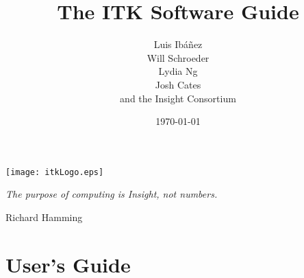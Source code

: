 \documentclass{InsightSoftwareGuide}
\title{The ITK Software Guide}
\author{Luis Ib\'{a}\~{n}ez\\Will Schroeder\\Lydia Ng\\Josh Cates\\and the Insight Consortium}
\date{\today}
\newif\ifitkFullVersion
\newif\ifitkPrintedVersion
\begin{document}

\maketitle

\frontmatter




%
%
\newpage

\begin{minipage}[t][10cm][b]{\textwidth}
\center
\texttt{[image: itkLogo.eps]}
\large
\begin{center}
\emph{The purpose of computing is Insight, not numbers.}\\
\end{center}
\hspace{8cm} Richard Hamming
\normalsize
\end{minipage}

\newpage




\ifitkFullVersion 


\fi


%
%

\small
\tableofcontents
\listoffigures
\listoftables
\normalsize


% 
% 

\mainmatter

\ifitkFullVersion
\part{Introduction}




\fi


\part{User's Guide}
\end{document}
